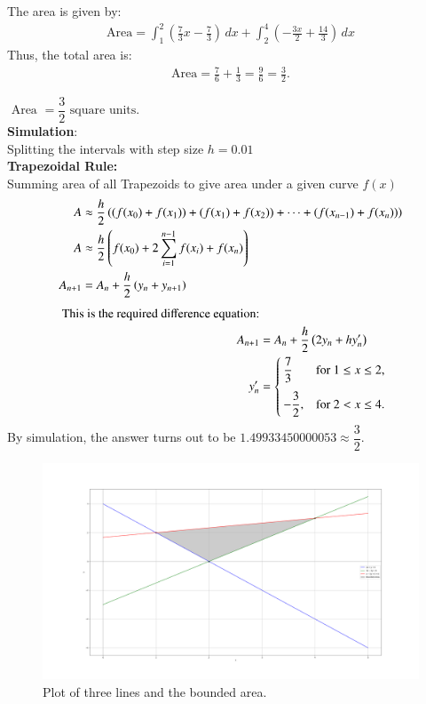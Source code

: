 \documentclass[journal]{IEEEtran}
\numberwithin{equation}{enumi}
\numberwithin{figure}{enumi}
\begin{document}
The area is given by:  
\begin{align}
   \text{Area} = \int_{1}^{2} \left( \frac{7}{3}x - \frac{7}{3} \right) \, dx
+ \int_{2}^{4} \left( -\frac{3x}{2} + \frac{14}{3} \right) \, dx
\end{align}
Thus, the total area is:  
\begin{align}
   \text{Area} = \frac{7}{6} + \frac{1}{3} = \frac{9}{6} = \frac{3}{2}. 
\end{align}

$\text{ Area }= \dfrac{3}{2} \text{ square units.}$\\
\textbf{Simulation}:
\\
Splitting the intervals  with step size $h = 0.01$
\\
\textbf{Trapezoidal Rule:}\\
Summing area of  all Trapezoids to give area under a given curve $f(x)$\\
\begin{align}
	A &\approx \frac{h}{2} \left((f(x_{0}) + f(x_{1})) + (f(x_{1}) + f(x_{2})) + \dots + (f(x_{n-1}) + f(x_{n}))\right) \\
	A &\approx \frac{h}{2} \left(f(x_{0}) + 2 \sum_{i=1}^{n-1} f(x_{i}) + f(x_{n}) \right)\\
    A_{n+1} &= A_{n} + \frac{h}{2} \left(y_{n} + y_{n+1}\right)
    \end{align}
    \begin{align}
    \text{This is the required difference equation:}\\
A_{n+1} &= A_{n} + \frac{h}{2} \left(2y_{n} +  h y^{\prime}_{n}\right)\\
y'_{n}&=\begin{cases} 
     \dfrac{7}{3}
 & \text{for } 1 \leq x \leq 2, \\[10pt]
 -\dfrac{3}{2} , & \text{for } 2 < x \leq 4.
\end{cases}
\end{align}
By simulation, the answer turns out to be $1.49933450000053  \approx \dfrac{3}{2}.$

\begin{figure}[h!]
    \centering
    \includegraphics[width=\columnwidth]{Figs/Figure_1.png}
    \caption{Plot of three lines and the bounded area.}
\end{figure}
\end{document}
